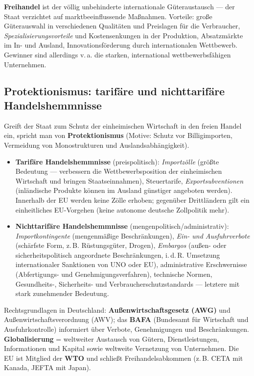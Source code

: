 \documentclass[11pt, a4paper]{article}
\begin{document}
\textbf{Freihandel} ist der völlig unbehinderte internationale Güteraustausch --- der Staat
verzichtet auf marktbeeinflussende Maßnahmen. Vorteile: große Güterauswahl in verschiedenen
Qualitäten und Preislagen für die Verbraucher, \emph{Spezialisierungsvorteile} und
Kostensenkungen in der Produktion, Absatzmärkte im In- und Ausland, Innovationsförderung
durch internationalen Wettbewerb. Gewinner sind allerdings v.\,a. die starken,
international wettbewerbsfähigen Unternehmen.

\subsection{Protektionismus: tarifäre und nichttarifäre Handelshemmnisse}

Greift der Staat zum Schutz der einheimischen Wirtschaft in den freien Handel ein, spricht
man von \textbf{Protektionismus} (Motive: Schutz vor Billigimporten, Vermeidung von
Monostrukturen und Auslandsabhängigkeit).

\begin{itemize}
  \item \textbf{Tarifäre Handelshemmnisse} (preispolitisch): \emph{Importzölle} (größte
    Bedeutung --- verbessern die Wettbewerbsposition der einheimischen Wirtschaft und
    bringen Staatseinnahmen), Steuertarife, \emph{Exportsubventionen} (inländische Produkte
    können im Ausland günstiger angeboten werden). Innerhalb der EU werden keine Zölle
    erhoben; gegenüber Drittländern gilt ein einheitliches EU-Vorgehen (keine autonome
    deutsche Zollpolitik mehr).
  \item \textbf{Nichttarifäre Handelshemmnisse} (mengenpolitisch/administrativ):
    \emph{Importkontingente} (mengenmäßige Beschränkungen), \emph{Ein- und Ausfuhrverbote}
    (schärfste Form, z.\,B. Rüstungsgüter, Drogen), \emph{Embargos} (außen- oder
    sicherheitspolitisch angeordnete Beschränkungen, i.\,d.\,R. Umsetzung internationaler
    Sanktionen von UNO oder EU), administrative Erschwernisse (Abfertigungs- und
    Genehmigungsverfahren), technische Normen, Gesundheits-, Sicherheits- und
    Verbraucherschutzstandards --- letztere mit stark zunehmender Bedeutung.
\end{itemize}

\begin{merksatz}
Rechtsgrundlagen in Deutschland: \textbf{Außenwirtschaftsgesetz (AWG)} und
Außenwirtschaftsverordnung (AWV); das \textbf{BAFA} (Bundesamt für Wirtschaft und
Ausfuhrkontrolle) informiert über Verbote, Genehmigungen und Beschränkungen.
\textbf{Globalisierung} = weltweiter Austausch von Gütern, Dienstleistungen, Informationen
und Kapital sowie weltweite Vernetzung von Unternehmen. Die EU ist Mitglied der
\textbf{WTO} und schließt Freihandelsabkommen (z.\,B. CETA mit Kanada, JEFTA mit Japan).
\end{merksatz}
\end{document}
